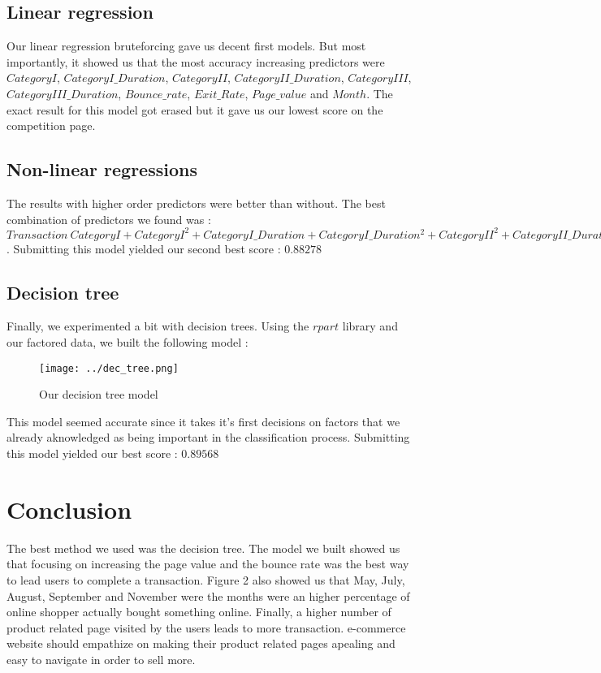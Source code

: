 \documentclass[11pt]{article}
\begin{document}
\subsection*{Linear regression}
Our linear regression bruteforcing gave us decent first models. But most importantly, it showed us that the most accuracy increasing predictors were $CategoryI$, $CategoryI\_ Duration$, $CategoryII$, $CategoryII\_ Duration$, $CategoryIII$, $CategoryIII\_ Duration$, $Bounce\_ rate$, $Exit\_ Rate$, $Page\_ value$ and $Month$.
The exact result for this model got erased but it gave us our lowest score on the competition page.
\newpage 
\subsection*{Non-linear regressions}
The results with higher order predictors were better than without. The best combination of predictors we found was :\\
$Transaction ~ CategoryI + CategoryI^2 + CategoryI\_ Duration + CategoryI\_ Duration^2 + CategoryII^2 + CategoryII\_ Duration + CategoryII\_ Duration^2 + CategoryIII^2 + CategoryIII\_ Duration^2 + Bounce\_ Rate + Exit\_ Rate + Exit\_ Rate^2 + Page\_ Value + Page\_ Value^2 + Month$.
Submitting this model yielded our second best score : $0.88278$
\subsection*{Decision tree}
Finally, we experimented a bit with decision trees. Using the $rpart$ library and our factored data, we built the following model : \\
\begin{figure}[h]
\centering
\texttt{[image: ../dec\_tree.png]}
\caption{Our decision tree model}
\end{figure}
\noindent 
This model seemed accurate since it takes it's first decisions on factors that we already aknowledged as being important in the classification process.
Submitting this model yielded our best score : $0.89568$
\newpage
\section*{Conclusion}
The best method we used was the decision tree. The model we built showed us that focusing on increasing the page value and the bounce rate was the best way to lead users to complete a transaction. 
Figure 2 also showed us that May, July, August, September and November were the months were an higher percentage of online shopper actually bought something online.
Finally, a higher number of product related page visited by the users leads to more transaction. e-commerce website should empathize on making their product related pages apealing and easy to navigate in order to sell more.
\end{document}
